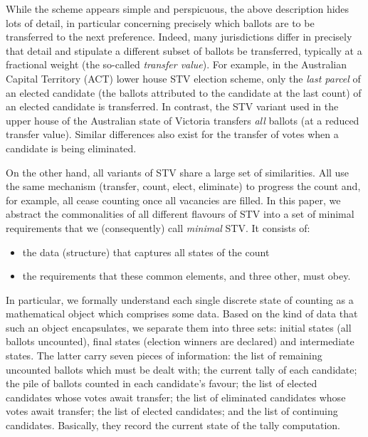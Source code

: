 \documentclass{llncs}
\begin{document}
\noindent
While the scheme appears simple and perspicuous, the above
description hides lots of detail, in particular concerning precisely
which ballots are to be transferred to the next preference.
Indeed, many jurisdictions differ in precisely that detail and
stipulate a different subset of ballots be transferred, typically at
a fractional weight (the so-called \emph{transfer value}). 
For example, in the Australian Capital Territory (ACT) lower house
STV election scheme, only the 
\emph{last parcel} of an elected candidate (the ballots attributed
to the candidate at the last
count)  of an elected candidate is transferred. In
contrast, the STV variant used in the upper house of the
Australian state of Victoria transfers \emph{all} ballots (at a
reduced transfer value). Similar differences also exist for the
transfer of votes when a candidate is being eliminated. 

On the other hand, all variants of STV share a large set of
similarities. All use the same mechanism (transfer, count, elect,
eliminate) to progress the count
and, 
for example, all 
cease counting once all
vacancies are filled. 
%
In this paper, we abstract the commonalities of all different
flavours of STV into a set of minimal requirements that we
(consequently) call 
\emph{minimal} STV. It consists of:
\begin{itemize}
\item the data (structure) that captures all states of the count
\item the requirements that these common elements, and three
  other, must obey.
\end{itemize}
\noindent
In particular, we formally understand each single
discrete state of counting as a mathematical object
which comprises some data. Based on the kind of data that such an
object encapsulates, we separate them into three sets: initial
states (all ballots uncounted), final states
(election winners are declared) and intermediate states. The latter
carry seven pieces of information: 
the list of remaining uncounted ballots which must be dealt with;
the current tally of each candidate; 
the pile of ballots counted in each candidate's favour;
the list of elected candidates whose votes await transfer;
the list of eliminated candidates whose votes await transfer;
the list of elected candidates; 
and the list of continuing candidates. 
Basically, they record the current state of the tally computation.
\end{document}
